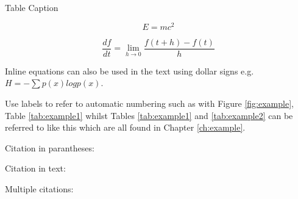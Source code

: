 \begin{table}[t]
\centering
\caption[Table caption entry for list of tables]{Table Caption}
\label{tab:example2}
\end{table}


\begin{equation} \label{eq:example}
E=mc^{2}
\end{equation}

\begin{equation} \label{eq:calculus}
\frac{df}{dt}=\lim_{h\to0}\frac{f(t+h)-f(t)}{h}
\end{equation}

Inline equations can also be used in the text using dollar signs e.g. $H=-\sum p(x) logp(x)$.


Use labels to refer to automatic numbering such as with Figure \ref{fig:example}, Table \ref{tab:example1} whilst Tables \ref{tab:example1} and \ref{tab:example2} can be referred to like this which are all found in Chapter \ref{ch:example}.

Citation in parantheses: \citep{Soo2011}

Citation in text: \citet{Greenberg2012}

Multiple citations: \citep{Soo2011,Suctani2011,Greenberg2012}







	

